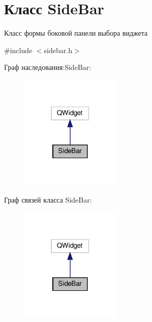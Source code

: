 \hypertarget{classSideBar}{}\section{Класс Side\+Bar}
\label{classSideBar}


Класс формы боковой панели выбора виджета  




{\ttfamily \#include $<$sidebar.\+h$>$}



Граф наследования\+:Side\+Bar\+:\nopagebreak
\begin{figure}[H]
\begin{center}
\leavevmode
\includegraphics[width=135pt]{classSideBar__inherit__graph}
\end{center}
\end{figure}


Граф связей класса Side\+Bar\+:\nopagebreak
\begin{figure}[H]
\begin{center}
\leavevmode
\includegraphics[width=135pt]{classSideBar__coll__graph}
\end{center}
\end{figure}
